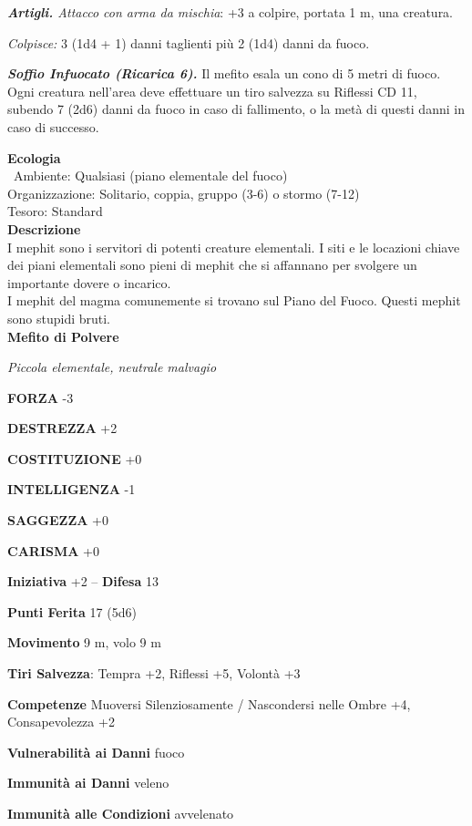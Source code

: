 \begin{multicols}{2}
\emph{\textbf{Artigli.} Attacco con arma da mischia}: +3 a colpire,
portata 1 m, una creatura.

\emph{Colpisce:} 3 (1d4 + 1) danni taglienti più 2 (1d4) danni da fuoco.

\emph{\textbf{Soffio Infuocato (Ricarica 6).}} Il mefito esala un cono
di 5 metri di fuoco. Ogni creatura nell'area deve effettuare un tiro
salvezza su Riflessi CD 11, subendo 7 (2d6) danni da fuoco in caso di
fallimento, o la metà di questi danni in caso di successo.

\textbf{Ecologia}\\\
Ambiente: Qualsiasi (piano elementale del fuoco)\\
Organizzazione: Solitario, coppia, gruppo (3-6) o stormo (7-12)\\
Tesoro: Standard\\
\textbf{Descrizione}\\
I mephit sono i servitori di potenti creature elementali. I siti e le locazioni chiave dei piani elementali sono pieni di mephit che si affannano per svolgere un importante dovere o incarico.\\
I mephit del magma comunemente si trovano sul Piano del Fuoco. Questi mephit sono stupidi bruti.\\


\medskip{}\textbf{Mefito di Polvere}

\emph{Piccola elementale, neutrale malvagio}

\textbf{FORZA} -3

\textbf{DESTREZZA} +2

\textbf{COSTITUZIONE} +0

\textbf{INTELLIGENZA} -1

\textbf{SAGGEZZA} +0

\textbf{CARISMA} +0

\textbf{Iniziativa} +2 -- \textbf{Difesa} 13

\textbf{Punti Ferita} 17 (5d6)

\textbf{Movimento} 9 m, volo 9 m

\textbf{Tiri Salvezza}: Tempra +2, Riflessi +5, Volontà +3

\textbf{Competenze} Muoversi Silenziosamente / Nascondersi nelle Ombre +4, Consapevolezza +2

\textbf{Vulnerabilità ai Danni} fuoco

\textbf{Immunità ai Danni} veleno

\textbf{Immunità alle Condizioni} avvelenato


\end{multicols}
